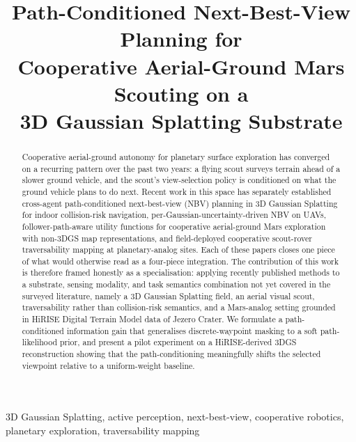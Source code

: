 \documentclass[conference]{IEEEtran}
\begin{document}
\title{Path-Conditioned Next-Best-View Planning for\\
Cooperative Aerial-Ground Mars Scouting on a\\
3D Gaussian Splatting Substrate}

\author{
}

\maketitle

\begin{abstract}
Cooperative aerial-ground autonomy for planetary surface exploration has converged on a recurring pattern over the past two years: a flying scout surveys terrain ahead of a slower ground vehicle, and the scout's view-selection policy is conditioned on what the ground vehicle plans to do next. Recent work in this space has separately established cross-agent path-conditioned next-best-view (NBV) planning in 3D Gaussian Splatting for indoor collision-risk navigation, per-Gaussian-uncertainty-driven NBV on UAVs, follower-path-aware utility functions for cooperative aerial-ground Mars exploration with non-3DGS map representations, and field-deployed cooperative scout-rover traversability mapping at planetary-analog sites. Each of these papers closes one piece of what would otherwise read as a four-piece integration. The contribution of this work is therefore framed honestly as a specialisation: applying recently published methods to a substrate, sensing modality, and task semantics combination not yet covered in the surveyed literature, namely a 3D Gaussian Splatting field, an aerial visual scout, traversability rather than collision-risk semantics, and a Mars-analog setting grounded in HiRISE Digital Terrain Model data of Jezero Crater. We formulate a path-conditioned information gain that generalises discrete-waypoint masking to a soft path-likelihood prior, and present a pilot experiment on a HiRISE-derived 3DGS reconstruction showing that the path-conditioning meaningfully shifts the selected viewpoint relative to a uniform-weight baseline.
\end{abstract}

\begin{IEEEkeywords}
3D Gaussian Splatting, active perception, next-best-view, cooperative robotics, planetary exploration, traversability mapping
\end{IEEEkeywords}
\end{document}
